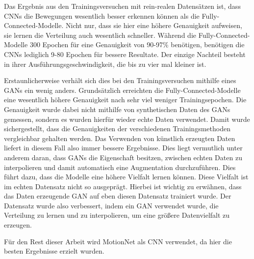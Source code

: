 Das Ergebnis aus den Trainingsversuchen mit rein-realen Datensätzen ist, dass
CNNs die Bewegungen wesentlich besser erkennen können als die
Fully-Connected-Modelle. Nicht nur, dass sie hier eine höhere Genauigkeit
aufweisen, sie lernen die Verteilung auch wesentlich schneller. Während die
Fully-Connected-Modelle 300 Epochen für eine Genauigkeit von 90-97\% benötigen,
benötigen die CNNs lediglich 9-80 Epochen für bessere Resultate. Der einzige
Nachteil besteht in ihrer Ausführungsgeschwindigkeit, die bis zu vier mal
kleiner ist.

Erstaunlicherweise verhält sich dies bei den Trainingsversuchen mithilfe eines
GANs ein wenig anders. Grundsätzlich erreichten die Fully-Connected-Modelle eine
wesentlich höhere Genauigkeit nach sehr viel weniger Trainingsepochen. Die
Genauigkeit wurde dabei nicht mithilfe von synthetischen Daten des GANs
gemessen, sondern es wurden hierfür wieder echte Daten verwendet. Damit wurde
sichergestellt, dass die Genauigkeiten der verschiedenen Trainingsmethoden
vergleichbar gehalten werden. Das Verwenden von künstlich erzeugten Daten
liefert in diesem Fall also immer bessere Ergebnisse. Dies liegt vermutlich
unter anderem daran, dass GANs die Eigenschaft besitzen, zwischen echten Daten
zu interpolieren und damit automatisch eine Augmentation durchzuführen. Dies
führt dazu, dass die Modelle eine höhere Vielfalt lernen können. Diese Vielfalt
ist im echten Datensatz nicht so ausgeprägt. Hierbei ist wichtig zu erwähnen,
dass das Daten erzeugende GAN auf eben diesen Datensatz trainiert wurde. Der
Datensatz wurde also verbessert, indem ein GAN verwendet wurde, die Verteilung
zu lernen und zu interpolieren, um eine größere Datenvielfalt zu erzeugen.

Für den Rest dieser Arbeit wird MotionNet als CNN verwendet, da hier die besten
Ergebnisse erzielt wurden.


